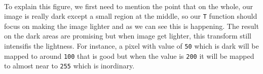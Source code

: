 \documentclass[11pt]{article}
\begin{document}
    \begin{center}
    \end{center}
    { \hspace*{\fill} \\}
    
    To explain this figure, we first need to mention the point that on the
whole, our image is really dark except a small region at the middle, so
our \texttt{T} function should focus on making the image lighter and as
we can see this is happening. The result on the dark areas are promising
but when image get lighter, this transform still intensifis the
lightness. For instance, a pixel with value of \texttt{50} which is dark
will be mapped to around \texttt{100} that is good but when the value is
\texttt{200} it will be mapped to almost near to \texttt{255} which is
inordinary.


    
    
    
    
\end{document}
